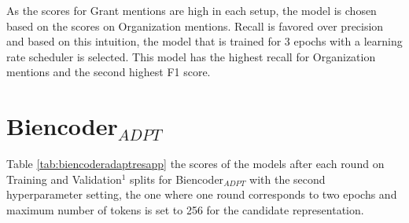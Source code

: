 \documentclass{report}
\theoremstyle{definition}
\theoremstyle{remark}
\begin{document}
As the scores for Grant mentions are high in each setup, the model is chosen based on the scores on Organization mentions. Recall is favored over precision and based on this intuition, the model that is trained for 3 epochs with a learning rate scheduler is selected. This model has the highest recall for Organization mentions and the second highest F1 score. 


\section{Biencoder$_{ADPT}$}
\label{sec:app:biencoderadapt}
Table \ref{tab:biencoderadaptresapp} the scores of the models after each round on Training and Validation$^1$ splits for Biencoder$_{ADPT}$ with the second hyperparameter setting, the one where one round corresponds to two epochs and maximum number of tokens is set to 256 for the candidate representation.
\newpage
\end{document}
